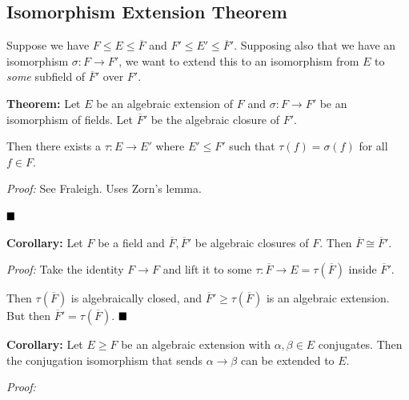 \hypertarget{isomorphism-extension-theorem}{%
\subsection{Isomorphism Extension
Theorem}\label{isomorphism-extension-theorem}}

Suppose we have \(F\leq E \leq \overline F\) and
\(F' \leq E' \leq \overline{F}'\). Supposing also that we have an
isomorphism \(\sigma: F \to F'\), we want to extend this to an
isomorphism from \(E\) to \emph{some} subfield of \(\overline{F}'\) over
\(F'\).

\textbf{Theorem:} Let \(E\) be an algebraic extension of \(F\) and
\(\sigma: F \to F'\) be an isomorphism of fields. Let \(\overline{F}'\)
be the algebraic closure of \(F'\).

Then there exists a \(\tau: E \to E'\) where \(E' \leq F'\) such that
\(\tau(f) = \sigma(f)\) for all \(f \in F\).

\emph{Proof:} See Fraleigh. Uses Zorn's lemma.

\(\qed\)

\textbf{Corollary:} Let \(F\) be a field and
\(\overline F, \overline F'\) be algebraic closures of \(F\). Then
\(\overline F \cong \overline F'\).

\emph{Proof:} Take the identity \(F \to F\) and lift it to some
\(\tau: \overline F \to E = \tau(\overline F)\) inside
\(\overline F '\).

\begin{center}
\end{center}

Then \(\tau(\overline F)\) is algebraically closed, and
\(\overline F' \geq \tau(\overline F)\) is an algebraic extension. But
then \(\overline F' = \tau(\overline F)\). \(\qed\)

\textbf{Corollary:} Let \(E \geq F\) be an algebraic extension with
\(\alpha, \beta \in E\) conjugates. Then the conjugation isomorphism
that sends \(\alpha \to \beta\) can be extended to \(E\).

\emph{Proof:}

\begin{center}
\end{center}

